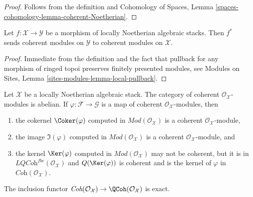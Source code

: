 \begin{proof}
Follows from the definition and
Cohomology of Spaces, Lemma
\ref{spaces-cohomology-lemma-coherent-Noetherian}.
\end{proof}

\begin{lemma}
\label{lemma-pullback-coherent}
Let $f : \mathcal{X} \to \mathcal{Y}$ be a morphism of locally
Noetherian algebraic stacks. Then $f^*$ sends coherent modules
on $\mathcal{Y}$ to coherent modules on $\mathcal{X}$.
\end{lemma}

\begin{proof}
Immediate from the definition and the fact that pullback for any morphism
of ringed topoi preserves finitely presented modules, see
Modules on Sites, Lemma \ref{sites-modules-lemma-local-pullback}.
\end{proof}

\begin{lemma}
\label{lemma-coherent-abelian-Noetherian}
Let $\mathcal{X}$ be a locally Noetherian algebraic stack.
The category of coherent $\mathcal{O}_\mathcal{X}$-modules is abelian.
If $\varphi : \mathcal{F} \to \mathcal{G}$ is a map
of coherent $\mathcal{O}_\mathcal{X}$-modules, then
\begin{enumerate}
\item the cokernel $\Coker(\varphi)$ computed in
$\textit{Mod}(\mathcal{O}_\mathcal{X})$ is a coherent
$\mathcal{O}_\mathcal{X}$-module,
\item the image $\Im(\varphi)$ computed in
$\textit{Mod}(\mathcal{O}_\mathcal{X})$ is a coherent
$\mathcal{O}_\mathcal{X}$-module, and
\item the kernel $\Ker(\varphi)$ computed in
$\textit{Mod}(\mathcal{O}_\mathcal{X})$
may not be coherent, but it is
in $\textit{LQCoh}^{fbc}(\mathcal{O}_\mathcal{X})$ and $Q(\Ker(\varphi))$
is coherent and is the kernel of $\varphi$ in
$\textit{Coh}(\mathcal{O}_\mathcal{X})$.
\end{enumerate}
The inclusion functor $\textit{Coh}(\mathcal{O}_\mathcal{X}) \to
\QCoh(\mathcal{O}_\mathcal{X})$ is exact.
\end{lemma}


